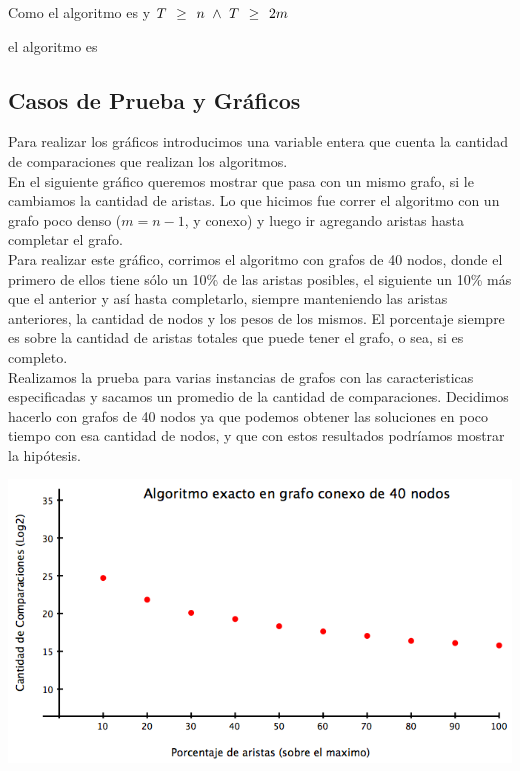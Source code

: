 \documentclass[a4paper, 10pt]{article}
\begin{document}
Como el algoritmo es  y $T \mai n \ \wedge \ T \mai 2m$ \entonces {} \pertenece {} 

\begin{center}
 \vspace*{0.5em} \entonces el algoritmo es 
\end{center} 

\newpage

\subsection{Casos de Prueba y Gr\'aficos}

Para realizar los gr\'aficos introducimos una variable entera que cuenta la cantidad de comparaciones que realizan los algoritmos. \\

En el siguiente gr\'afico queremos mostrar que pasa con un mismo grafo, si le cambiamos la cantidad de aristas. Lo que hicimos fue correr el algoritmo con un grafo poco denso ($m = n-1$, y conexo) y luego ir agregando aristas hasta completar el grafo. \\

Para realizar este gr\'afico, corrimos el algoritmo con grafos de 40 nodos, donde el primero de ellos tiene s\'olo un 10\% de las aristas posibles, el siguiente un 10\% m\'as que el anterior y as\'i hasta completarlo, siempre manteniendo las aristas anteriores, la cantidad de nodos y los pesos de los mismos. El porcentaje siempre es sobre la cantidad de aristas totales que puede tener el grafo, o sea, si es completo.\\ 

Realizamos la prueba para varias instancias de grafos con las caracteristicas especificadas y sacamos un promedio de la cantidad de comparaciones.
Decidimos hacerlo con grafos de 40 nodos ya que podemos obtener las soluciones en poco tiempo con esa cantidad de nodos, y que con estos resultados podr\'iamos mostrar la hip\'otesis. \\

\begin{center}
	\includegraphics[scale=0.50]{Graficos/03-02.png}
\end{center}
\end{document}
